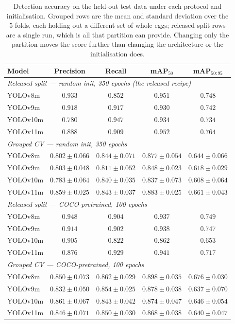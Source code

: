 \begin{table}[t]
\centering\small
\caption{Detection accuracy on the held-out test data under each protocol and initialisation. Grouped rows are the mean and standard deviation over the 5 folds, each holding out a different set of whole eggs; released-split rows are a single run, which is all that partition can provide. Changing only the partition moves the score further than changing the architecture or the initialisation does.}
\label{tab:main}
\begin{tabular}{lcccc}
\toprule
Model & Precision & Recall & mAP$_{50}$ & mAP$_{50:95}$ \\
\midrule
\multicolumn{5}{l}{\emph{Released split --- random init, 350 epochs (the released recipe)}} \\
YOLOv8m & $0.933$ & $0.852$ & $0.951$ & $0.748$ \\
YOLOv9m & $0.918$ & $0.917$ & $0.930$ & $0.742$ \\
YOLOv10m & $0.780$ & $0.947$ & $0.934$ & $0.734$ \\
YOLOv11m & $0.888$ & $0.909$ & $0.952$ & $0.764$ \\
\midrule
\multicolumn{5}{l}{\emph{Grouped CV --- random init, 350 epochs}} \\
YOLOv8m & $0.802 \pm 0.066$ & $0.844 \pm 0.071$ & $0.877 \pm 0.054$ & $0.644 \pm 0.066$ \\
YOLOv9m & $0.803 \pm 0.048$ & $0.811 \pm 0.052$ & $0.848 \pm 0.023$ & $0.618 \pm 0.029$ \\
YOLOv10m & $0.783 \pm 0.064$ & $0.840 \pm 0.035$ & $0.837 \pm 0.073$ & $0.608 \pm 0.064$ \\
YOLOv11m & $0.859 \pm 0.025$ & $0.843 \pm 0.037$ & $0.883 \pm 0.025$ & $0.661 \pm 0.043$ \\
\midrule
\multicolumn{5}{l}{\emph{Released split --- COCO-pretrained, 100 epochs}} \\
YOLOv8m & $0.948$ & $0.904$ & $0.937$ & $0.749$ \\
YOLOv9m & $0.914$ & $0.902$ & $0.938$ & $0.747$ \\
YOLOv10m & $0.905$ & $0.822$ & $0.862$ & $0.653$ \\
YOLOv11m & $0.876$ & $0.929$ & $0.941$ & $0.717$ \\
\midrule
\multicolumn{5}{l}{\emph{Grouped CV --- COCO-pretrained, 100 epochs}} \\
YOLOv8m & $0.850 \pm 0.073$ & $0.862 \pm 0.029$ & $0.898 \pm 0.035$ & $0.676 \pm 0.030$ \\
YOLOv9m & $0.832 \pm 0.050$ & $0.854 \pm 0.025$ & $0.878 \pm 0.038$ & $0.637 \pm 0.070$ \\
YOLOv10m & $0.861 \pm 0.067$ & $0.843 \pm 0.042$ & $0.874 \pm 0.047$ & $0.646 \pm 0.054$ \\
YOLOv11m & $0.846 \pm 0.071$ & $0.850 \pm 0.030$ & $0.868 \pm 0.038$ & $0.640 \pm 0.047$ \\
\bottomrule
\end{tabular}
\end{table}
